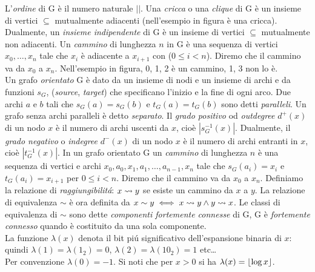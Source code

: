 \noindent L'\textit{ordine} di G è il numero naturale $|$$|$. Una \textit{cricca} o una \textit{clique} di G è un insieme di vertici  $\subseteq$  mutualmente adiacenti (nell'esempio in figura  è una cricca). Dualmente, un \textit{insieme indipendente} di G è un insieme di vertici  $\subseteq$  mutualmente non adiacenti. Un \textit{cammino} di lunghezza $n$ in G è una sequenza di vertici $x_0, \dots, x_{n}$ tale che $x_i$ è adiacente a $x_{i + 1}$ con ($0 \leq i < n$). Diremo che il cammino va da $x_0$ a $x_{n}$. Nell'esempio in figura, 0, 1, 2 è un cammino, 1, 3 non lo è.\\
Un grafo \textit{orientato} G è dato da un insieme di nodi  e un insieme di archi  e da funzioni $s_G$,  (\textit{source}, \textit{target}) che specificano l'inizio e la fine di ogni arco. Due archi $a$ e $b$ tali che $s_G(a) = s_G(b)$ e $t_G(a) = t_G(b)$ sono detti \textit{paralleli}. Un grafo senza archi paralleli è detto \textit{separato}. Il \textit{grado positivo} od \textit{outdegree} $d^+(x)$ di un nodo $x$ è il numero di archi uscenti da $x$, cioè $|s_G^{-1}(x)|$. Dualmente, il \textit{grado negativo} o \textit{indegree} $d^-(x)$ di un nodo $x$ è il numero di archi entranti in $x$, cioè $|t_G^{-1}(x)|$. In un grafo orientato G un \textit{cammino} di lunghezza $n$ è una sequenza di vertici e archi $x_0, a_0, x_1, a_1, \dots, a_{n - 1}, x_n$ tale che $s_G(a_i) = x_i$ e $t_G(a_i) = x_{i + 1}$ per $0 \leq i < n$. Diremo che il cammino va da $x_0$ a $x_n$.
Definiamo la relazione di \textit{raggiungibilitá}: $x \mathrel{\leadsto} y$ se esiste un cammino da $x$ a $y$. La relazione di equivalenza $\sim$ è ora definita da $x \sim y \iff x \mathrel{\leadsto} y \land y \mathrel{\leadsto} x$. Le classi di equivalenza di $\sim$ sono dette \textit{componenti fortemente connesse} di G, G è \textit{fortemente connesso} quando è costituito da una sola componente.\\
La funzione $\lambda(x)$ denota il bit piú significativo dell'espansione binaria di $x$: quindi $\lambda(1) = \lambda(1_2) = 0$, $\lambda(2) = \lambda(10_2) = 1$ etc\dots\\
Per convenzione $\lambda(0) = -1$. Si noti che per $x > 0$ si ha $\lambda(x) = \left\lfloor \log{x} \right\rfloor$.